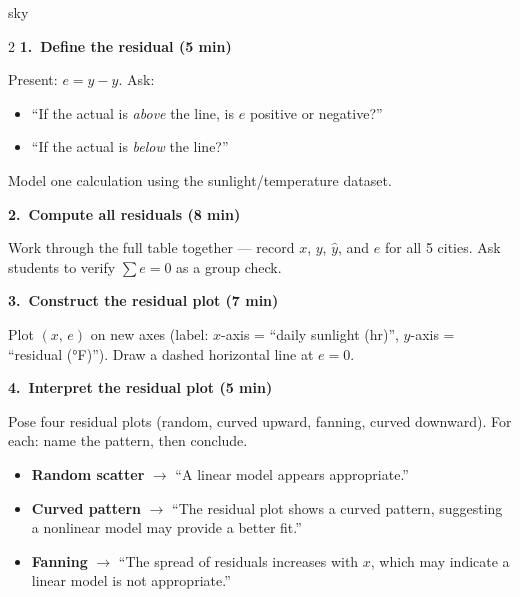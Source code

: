 \documentclass[10pt]{article}
\begin{document}
\begin{skillbox}[Lesson]{sky}
\begin{multicols}{2}
\textbf{1.\ Define the residual (5 min)}

Present: $e = y - \hat{y}$. Ask:
\begin{itemize}
    \item ``If the actual is \textit{above} the line, is $e$ positive or negative?''
    \item ``If the actual is \textit{below} the line?''
\end{itemize}
Model one calculation using the sunlight/temperature dataset.

\textbf{2.\ Compute all residuals (8 min)}

Work through the full table together --- record $x$, $y$, $\hat{y}$, and $e$ for all 5
cities. Ask students to verify $\sum e = 0$ as a group check.

\textbf{3.\ Construct the residual plot (7 min)}

Plot $(x,\, e)$ on new axes (label: $x$-axis = ``daily sunlight (hr)'',
$y$-axis = ``residual (°F)''). Draw a dashed horizontal line at $e = 0$.

\textbf{4.\ Interpret the residual plot (5 min)}

Pose four residual plots (random, curved upward, fanning, curved downward).
For each: name the pattern, then conclude.
\begin{itemize}
    \item \textbf{Random scatter} $\to$ ``A linear model appears appropriate.''
    \item \textbf{Curved pattern} $\to$ ``The residual plot shows a curved pattern, suggesting
          a nonlinear model may provide a better fit.''
    \item \textbf{Fanning} $\to$ ``The spread of residuals increases with $x$, which may
          indicate a linear model is not appropriate.''
\end{itemize}
\end{multicols}
\end{skillbox}
\end{document}
